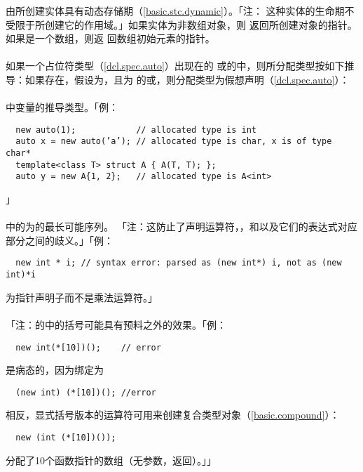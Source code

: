 由所创建实体具有动态存储期（\ref{basic.stc.dynamic}）。「注：
这种实体的生命期不受限于所创建它的作用域。」如果实体为非数组对象，则
返回所创建对象的指针。如果是一个数组，则返
回数组初始元素的指针。

\paragraph{}
如果一个占位符类型（\ref{dcl.spec.auto}）出现在的
或的中，则所分配类型按如下推
导：如果存在，假设为，且为
的或，则分配类型为假想声明（\ref{dcl.spec.auto}）：\\
\mbox{\qquad {}  \tm{;}} \\
中变量的推导类型。「例：
\begin{lstlisting}
  new auto(1);            // allocated type is int
  auto x = new auto(’a’); // allocated type is char, x is of type char*
  template<class T> struct A { A(T, T); };
  auto y = new A{1, 2};   // allocated type is A<int>
\end{lstlisting}」

\paragraph{}
中的为的最长可能序列。
「注：这防止了声明运算符\tm{\&}，\tm{\&\&}，\tm{*}和\tm{[]}以及它们的表达式对应
部分之间的歧义。」「例：
\begin{lstlisting}
  new int * i; // syntax error: parsed as (new int*) i, not as (new int)*i
\end{lstlisting}
\tm{*}为指针声明子而不是乘法运算符。」

\paragraph{}
「注：的中的括号可能具有预料之外的效果。「例：
\begin{lstlisting}
  new int(*[10])();    // error
\end{lstlisting}
是病态的，因为绑定为
\begin{lstlisting}
  (new int) (*[10])(); //error
\end{lstlisting}
相反，显式括号版本的运算符可用来创建复合类型对象（\ref{basic.compound}）：
\begin{lstlisting}
  new (int (*[10])());
\end{lstlisting}
分配了10个函数指针的数组（无参数，返回）。」」

